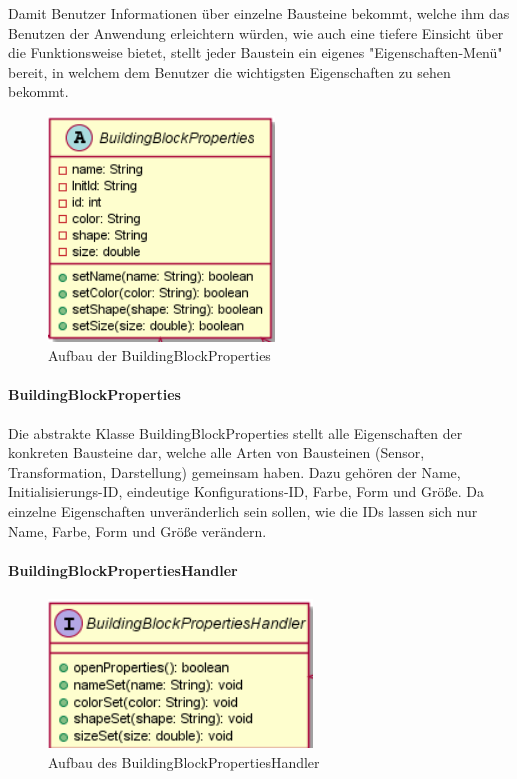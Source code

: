 \documentclass[parskip=full]{scrartcl}
\begin{document}
Damit Benutzer Informationen über einzelne Bausteine bekommt, welche ihm das Benutzen der Anwendung erleichtern würden, wie auch eine tiefere Einsicht über die Funktionsweise bietet, stellt jeder Baustein ein eigenes "Eigenschaften-Menü" bereit, in welchem dem Benutzer die wichtigsten Eigenschaften zu sehen bekommt.

\clearpage

\begin{figure}[htbp]
	\begin{center}
		\includegraphics[width = 6cm]{Grafiken/View/BuildingBlockProperties.png}
		\caption{Aufbau der BuildingBlockProperties}
		\label{Entwurf_Grob}
	\end{center}
\end{figure}

\paragraph{BuildingBlockProperties}

Die abstrakte Klasse BuildingBlockProperties stellt alle Eigenschaften der konkreten Bausteine dar, welche alle Arten von Bausteinen (Sensor, Transformation, Darstellung) gemeinsam haben. Dazu gehören der Name,  Initialisierungs-ID, eindeutige Konfigurations-ID, Farbe, Form und Größe. Da einzelne Eigenschaften unveränderlich sein sollen, wie die IDs lassen sich nur Name, Farbe, Form und Größe verändern.

\paragraph{BuildingBlockPropertiesHandler}

\begin{figure}[htbp]
	\begin{center}
		\includegraphics[width = 7cm]{Grafiken/View/BuildingBlockPropertiesHandler.png}
		\caption{Aufbau des BuildingBlockPropertiesHandler}
		\label{Entwurf_Grob}
	\end{center}
\end{figure}
\end{document}
